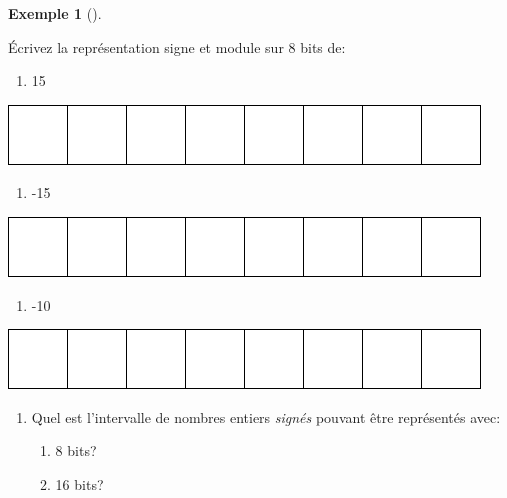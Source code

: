 \documentclass[
  letterpaper,
]{scrbook}
\providecommand{\tightlist}{%
  \setlength{\itemsep}{0pt}\setlength{\parskip}{0pt}}\usepackage{longtable,booktabs,array}
\theoremstyle{definition}
\newtheorem{example}{Exemple}[chapter]
\theoremstyle{definition}
\theoremstyle{plain}
\theoremstyle{remark}
\begin{document}
\leavevmode{}%
\begin{example}[]\label{exm-representation-signe-module-8-bits}

Écrivez la représentation signe et module sur 8 bits de:

\begin{enumerate}
\def\labelenumi{\alph{enumi})}
\tightlist
\item
  15
\end{enumerate}

\includegraphics{./systeme_numeration_files/figure-pdf/unnamed-chunk-4-1.pdf}

\begin{enumerate}
\def\labelenumi{\alph{enumi})}
\tightlist
\item
  -15
\end{enumerate}

\includegraphics{./systeme_numeration_files/figure-pdf/unnamed-chunk-5-1.pdf}

\begin{enumerate}
\def\labelenumi{\alph{enumi})}
\tightlist
\item
  -10
\end{enumerate}

\includegraphics{./systeme_numeration_files/figure-pdf/unnamed-chunk-6-1.pdf}

\begin{enumerate}
\def\labelenumi{\alph{enumi})}
\tightlist
\item
  Quel est l'intervalle de nombres entiers \emph{signés} pouvant être
  représentés avec:

  \begin{enumerate}
  \def\labelenumii{\roman{enumii}.}
  \tightlist
  \item
    8 bits?
  \item
    16 bits?
  \end{enumerate}
\end{enumerate}

\end{example}
\end{document}
